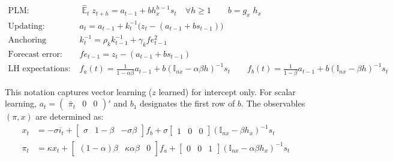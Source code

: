 \documentclass[11pt]{article}
\renewcommand{\[}{\begin{equation}}
\renewcommand{\]}{\end{equation}}
\DeclareMathOperator{\E}{\mathbb{E}}
\begin{document}
\begin{align}
\text{PLM:} \quad \quad & \hat{\E}_t z_{t+h}  =  a_{t-1} + bh_x^{h-1}s_t  \quad \forall h\geq 1 \quad \quad b = g_x\; h_x \quad \quad  \label{PLM} \\
\text{Updating:} \quad \quad & a_{t}  =a_{t-1} +k_t^{-1}\big(z_{t} -(a_{t-1}+b s_{t-1}) \big)  \label{A5} \\
\text{Anchoring function:} \quad \quad & k^{-1}_t  = \rho_k k^{-1}_{t-1} + \gamma_k fe_{t-1}^2 \label{A6}\\
\text{Forecast error:} \quad \quad & fe_{t-1}  = z_t - (a_{t-1}+b s_{t-1}) \label{A7} \\
\text{LH expectations:} \quad \quad & f_a(t) = \frac{1}{1-\alpha\beta}a_{t-1}  + b(\mathbb{I}_{nx} - \alpha\beta h)^{-1}s_t \quad \quad  f_b(t) = \frac{1}{1-\beta}a_{t-1}  + b(\mathbb{I}_{nx} - \beta h)^{-1}s_t  \label{A8}
\end{align}

\vspace{-0.5cm}

This notation captures vector learning ($z$ learned) for intercept only. For scalar learning, $a_t= \begin{pmatrix} \bar{\pi}_t & 0 & 0\end{pmatrix}' $ and $b_1$ designates the first row of $b$. The observables $(\pi, x)$ are determined as:
\begin{align}
x_t &=  -\sigma i_t + \begin{bmatrix} \sigma & 1-\beta & -\sigma\beta \end{bmatrix} f_b + \sigma \begin{bmatrix} 1 & 0 & 0 \end{bmatrix} (\mathbb{I}_{nx} - \beta h_x)^{-1} s_t \label{A9} \\
\pi_t &= \kappa x_t  + \begin{bmatrix} (1-\alpha)\beta & \kappa\alpha\beta & 0 \end{bmatrix}  f_a + \begin{bmatrix} 0 & 0 & 1 \end{bmatrix}  (\mathbb{I}_{nx} - \alpha \beta h_x)^{-1}  s_t \label{A10}
\end{align}
\end{document}
